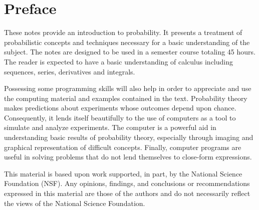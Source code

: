 \chapter*{Preface}

These notes provide an introduction to probability.
It presents a treatment of probabilistic concepts and techniques necessary for a basic understanding of the subject.
The notes are designed to be used in a semester course totaling 45 hours.
The reader is expected to have a basic understanding of calculus including sequences, series, derivatives and integrals.

Possessing some programming skills will also help in order to appreciate and use the computing material and examples contained in the text.
Probability theory makes predictions about experiments whose outcomes depend upon chance.
Consequently, it lends itself beautifully to the use of computers as a tool to simulate and analyze experiments.
The computer is a powerful aid in understanding basic results of probability theory, especially through imaging and graphical representation of difficult concepts.
Finally, computer programs are useful in solving problems that do not lend themselves to close-form expressions.

This material is based upon work supported, in part, by the National Science Foundation (NSF).
Any opinions, findings, and conclusions or recommendations expressed in this material are those of the authors and do not necessarily reflect the views of the National Science Foundation.

